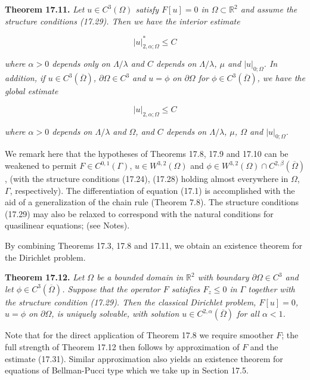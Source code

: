 \textbf{Theorem 17.11.} \textit{Let $u\in C^3(\Omega)$ satisfy $F[u]=0$ in $\Omega\subset\mathbb{R}^2$ and assume the structure conditions (17.29). Then we have the interior estimate}

\begin{equation}
|u|_{2,\alpha;\Omega}^*\le C
\tag{17.30}
\end{equation}

\textit{where $\alpha>0$ depends only on $\Lambda/\lambda$ and $C$ depends on $\Lambda/\lambda$, $\mu$ and $|u|_{0;\Omega}$. In addition, if $u\in C^3(\overline{\Omega})$, $\partial\Omega\in C^3$ and $u=\phi$ on $\partial\Omega$ for $\phi\in C^3(\overline{\Omega})$, we have the global estimate}

\begin{equation}
|u|_{2,\alpha;\Omega}\le C
\tag{17.31}
\end{equation}

\textit{where $\alpha>0$ depends on $\Lambda/\lambda$ and $\Omega$, and $C$ depends on $\Lambda/\lambda$, $\mu$, $\Omega$ and $|u|_{0;\Omega}$.}



We remark here that the hypotheses of Theorems 17.8, 17.9 and 17.10 can be weakened to permit
$F \in C^{0,1}(\Gamma)$, $u \in W^{3,2}(\Omega)$ and $\phi \in W^{3,2}(\Omega) \cap C^{2,\beta}(\overline{\Omega})$, (with the structure conditions (17.24), (17.28) holding almost everywhere in $\Omega$, $\Gamma$, respectively). The differentiation of equation (17.1) is accomplished with the aid of a generalization of the chain rule (Theorem 7.8). The structure conditions (17.29) may also be relaxed to correspond with the natural conditions for quasilinear equations; (see Notes).

By combining Theorems 17.3, 17.8 and 17.11, we obtain an existence theorem for the Dirichlet problem.

\textbf{Theorem 17.12.} \textit{Let $\Omega$ be a bounded domain in $\mathbb{R}^2$ with boundary $\partial\Omega \in C^3$ and let $\phi \in C^3(\overline{\Omega})$. Suppose that the operator $F$ satisfies $F_z \leq 0$ in $\Gamma$ together with the structure condition (17.29). Then the classical Dirichlet problem, $F[u] = 0$, $u = \phi$ on $\partial\Omega$, is uniquely solvable, with solution $u \in C^{2,\alpha}(\overline{\Omega})$ for all $\alpha < 1$.}

Note that for the direct application of Theorem 17.8 we require smoother $F$; the full strength of Theorem 17.12 then follows by approximation of $F$ and the estimate (17.31). Similar approximation also yields an existence theorem for equations of Bellman-Pucci type which we take up in Section 17.5.

